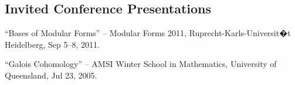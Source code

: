 \documentclass[10pt,a4paper]{article}
\renewenvironment{itemize}{
  \begin{list}{}{
    \setlength{\leftmargin}{1.5em}
    \setlength{\itemsep}{0.25em}
    \setlength{\parskip}{0pt}
    \setlength{\parsep}{0.25em}
  }
}{
  \end{list}
}
\begin{document}
\subsection*{Invited Conference Presentations}
\begin{itemize}
\item  ``Bases of Modular Forms'' -- Modular Forms 2011, Ruprecht-Karls-Universit�t Heidelberg, Sep 5--8, 2011.
\item ``Galois Cohomology'' -- AMSI Winter School in Mathematics, University of Queensland, Jul 23, 2005.
\end{itemize} 


%
\end{document}
